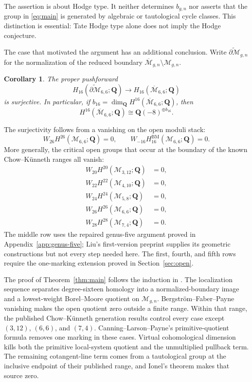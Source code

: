\documentclass[12pt,reqno]{amsart}
\newcommand{\Q}{\mathbf{Q}}
\newcommand{\M}{\mathcal{M}}
\newcommand{\Mbar}{\overline{\mathcal{M}}}
\newcommand{\BM}{\mathrm{BM}}
\newtheorem{corollary}[theorem]{Corollary}
\theoremstyle{definition}
\theoremstyle{remark}
\begin{document}
The assertion is about Hodge type.  It neither determines $b_{g,n}$ nor
asserts that the group in \eqref{eq:main} is generated by algebraic or
tautological cycle classes.  This distinction is essential: Tate Hodge type
alone does not imply the Hodge conjecture.

The case that motivated the argument has an additional conclusion.  Write
$\widetilde{\partial\M}_{g,n}$ for the normalization of the reduced boundary
$\Mbar_{g,n}\setminus\M_{g,n}$.

\begin{corollary}\label{cor:66-intro}
The proper pushforward
\begin{equation}\label{eq:66-boundary-surj-intro}
 H_{16}(\widetilde{\partial\M}_{6,6};\Q)
 \longrightarrow H_{16}(\Mbar_{6,6};\Q)
\end{equation}
is surjective.  In particular, if
$b_{16}=\dim_{\Q}H^{16}(\Mbar_{6,6};\Q)$, then
\[
 H^{16}(\Mbar_{6,6};\Q)\cong\Q(-8)^{\oplus b_{16}}.
\]
\end{corollary}

The surjectivity follows from a vanishing on the open moduli stack:
\begin{equation}\label{eq:66-open-intro}
 W_{26}H^{26}(\M_{6,6};\Q)=0,
 \qquad
 W_{-16}H^{\BM}_{16}(\M_{6,6};\Q)=0.
\end{equation}
More generally, the critical open groups that occur at the boundary of the
known Chow--K\"unneth ranges all vanish:
\begin{equation}\label{eq:critical-intro}
\begin{split}
 W_{20}H^{20}(\M_{3,12};\Q)&=0,\\
 W_{22}H^{22}(\M_{4,10};\Q)&=0,\\
 W_{24}H^{24}(\M_{5,8};\Q)&=0,\\
 W_{26}H^{26}(\M_{6,6};\Q)&=0,\\
 W_{28}H^{28}(\M_{7,4};\Q)&=0.
\end{split}
\end{equation}
The middle row uses the repaired genus-five argument proved in
Appendix~\ref{app:genus-five}; Liu's first-version preprint supplies its
geometric constructions but not every step needed here.  The first, fourth,
and fifth rows require the one-marking extension proved in
Section~\ref{sec:open}.

The proof of Theorem~\ref{thm:main} follows the induction in
\cite[Section~6.2]{CLP}.  The localization sequence separates degree-sixteen
homology into a normalized-boundary image and a lowest-weight Borel--Moore
quotient on $\M_{g,n}$.  Bergstr\"om--Faber--Payne vanishing makes the open
quotient zero outside a finite range.  Within that range, the published
Chow--K\"unneth generation results control every case except
$(3,12)$, $(6,6)$, and $(7,4)$.  Canning--Larson--Payne's
primitive-quotient formula removes one marking in these cases.  Virtual
cohomological dimension kills both the primitive local-system quotient and
the unmultiplied pullback term.  The remaining cotangent-line term comes
from a tautological group at the inclusive endpoint of their published
range, and Ionel's theorem makes that source zero.
\end{document}
